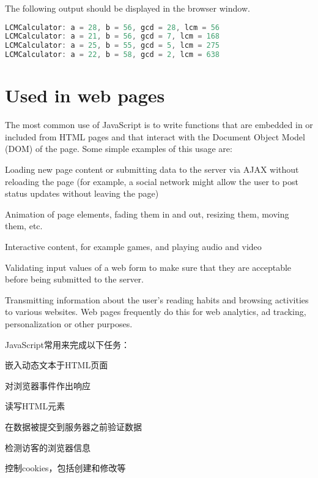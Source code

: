 The following output should be displayed in the browser window.


\begin{lstlisting}[language=JavaScript]
LCMCalculator: a = 28, b = 56, gcd = 28, lcm = 56
LCMCalculator: a = 21, b = 56, gcd = 7, lcm = 168
LCMCalculator: a = 25, b = 55, gcd = 5, lcm = 275
LCMCalculator: a = 22, b = 58, gcd = 2, lcm = 638
\end{lstlisting}


\chapter{Used in web pages}

The most common use of JavaScript is to write functions that are embedded in or included from HTML pages and that interact with the Document Object Model (DOM) of the page. Some simple examples of this usage are:


\begin{compactitem}
\item Loading new page content or submitting data to the server via AJAX without reloading the page (for example, a social network might allow the user to post status updates without leaving the page)
\item Animation of page elements, fading them in and out, resizing them, moving them, etc.
\item Interactive content, for example games, and playing audio and video
\item Validating input values of a web form to make sure that they are acceptable before being submitted to the server.
\item Transmitting information about the user's reading habits and browsing activities to various websites. Web pages frequently do this for web analytics, ad tracking, personalization or other purposes.
\end{compactitem}

JavaScript常用来完成以下任务：

\begin{compactitem}
\item 嵌入动态文本于HTML页面
\item 对浏览器事件作出响应
\item 读写HTML元素
\item 在数据被提交到服务器之前验证数据
\item 检测访客的浏览器信息
\item 控制cookies，包括创建和修改等
\end{compactitem}




